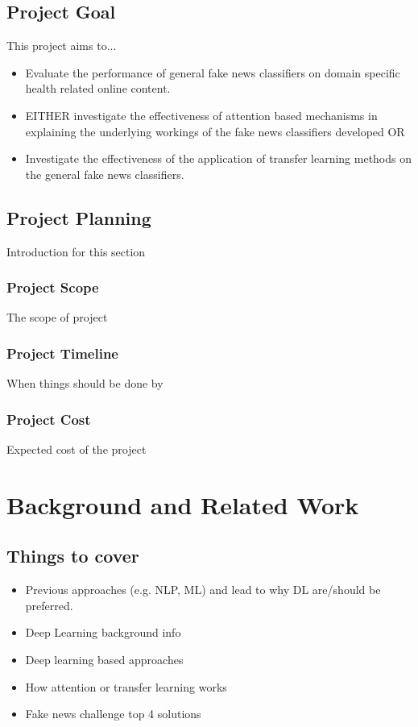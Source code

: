 \documentclass[a4paper,twoside,phd]{BYUPhys}
\begin{document}
\section{Project Goal}
\label{sec:ProjectGoal}

This project aims to...

\begin{itemize}
	\item Evaluate the performance of general fake news classifiers on domain specific health related online content.
	\item EITHER investigate the effectiveness of attention based mechanisms in explaining the underlying workings of the fake news classifiers developed OR
	\item Investigate the effectiveness of the application of transfer learning methods on the general fake news classifiers.
\end{itemize}

\section{Project Planning}
\label{sec:ProjectPlan}
Introduction for this section

\subsection{Project Scope}
\label{sec:ProjectScope}
The scope of project

\subsection{Project Timeline}
\label{sec:ProjectTimeline}
When things should be done by

\subsection{Project Cost}
\label{sec:ProjectCost}
Expected cost of the project




\chapter{Background and Related Work}
\label{chap:LitReview}

\section{Things to cover}
\begin{itemize}
	\item Previous approaches (e.g. NLP, ML) and lead to why DL are/should be preferred.
	\item Deep Learning background info
	\item Deep learning based approaches
	\item How attention or transfer learning works
	\item Fake news challenge top 4 solutions
\end{itemize}
\end{document}
